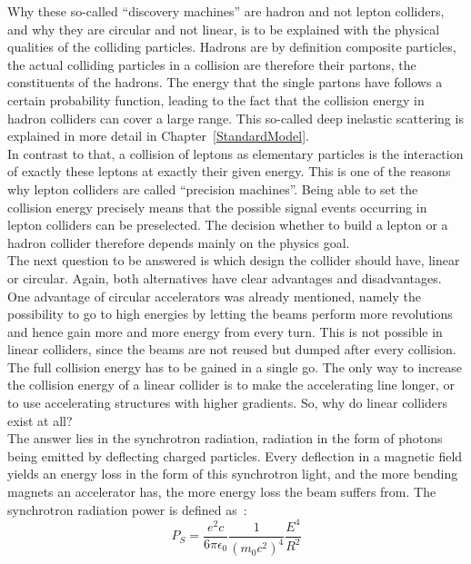 Why these so-called ``discovery machines'' are hadron and not lepton colliders, and why they are circular and not linear, is to be explained with the physical qualities of the colliding particles.
Hadrons are by definition composite particles, the actual colliding particles in a collision are therefore their partons, the constituents of the hadrons.
The energy that the single partons have follows a certain probability function, leading to the fact that the collision energy in hadron colliders can cover a large range.
This so-called deep inelastic scattering is explained in more detail in Chapter~\ref{StandardModel}.\\
In contrast to that, a collision of leptons as elementary particles is the interaction of exactly these leptons at exactly their given energy.
This is one of the reasons why lepton colliders are called ``precision machines''.
Being able to set the collision energy precisely means that the possible signal events occurring in lepton colliders can be preselected.
The decision whether to build a lepton or a hadron collider therefore depends mainly on the physics goal.
\\
The next question to be answered is which design the collider should have, linear or circular.
Again, both alternatives have clear advantages and disadvantages.
One advantage of circular accelerators was already mentioned, namely the possibility to go to high energies by letting the beams perform more revolutions and hence gain more and more energy from every turn.
This is not possible in linear colliders, since the beams are not reused but dumped after every collision.
The full collision energy has to be gained in a single go.
The only way to increase the collision energy of a linear collider is to make the accelerating line longer, or to use accelerating structures with higher gradients.
So, why do linear colliders exist at all?\\
The answer lies in the synchrotron radiation, radiation in the form of photons being emitted by deflecting charged particles.
Every deflection in a magnetic field yields an energy loss in the form of this synchrotron light, and the more bending magnets an accelerator has, the more energy loss the beam suffers from.
The synchrotron radiation power is defined as~\cite[p. 33]{Wille}:
\begin{equation}
 P_S = \frac{e^2c}{6\pi\epsilon_0}\frac{1}{(m_0c^2)^4}\frac{E^4}{R^2}
\end{equation}
